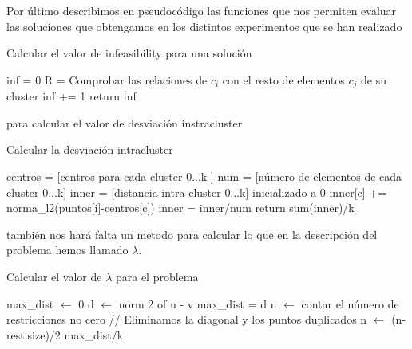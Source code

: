 \documentclass[11pt]{article}
\begin{document}
Por último describimos en pseudocódigo las funciones que nos permiten evaluar
las soluciones que obtengamos en los distintos experimentos que se han realizado

\begin{algorithm}[H]
  \caption{Calcular el valor de infeasibility para una solución}
  \label{alg-inf}
  \begin{algorithmic}[1]
    \State inf = 0
    \State R = Comprobar las relaciones de $c_i$ con el resto de elementos $c_j$ de su cluster
    \State inf += 1
    \EndIf
    \EndFor
    \EndFor
    \State return inf
    \EndProcedure
  \end{algorithmic}
  \end{algorithm}
  
para calcular el valor de desviación instracluster
  
  \begin{algorithm}[H]
  \caption{Calcular la desviación intracluster}
  \label{alg-intra}
  \begin{algorithmic}[1]
    \State centros = [centros para cada cluster 0...k ]
    \State num = [número de elementos de cada cluster 0...k]
    \State inner = [distancia intra cluster 0...k] inicializado a 0
    \State inner[c] += norma\_l2(puntos[i]-centros[c])
    \EndFor
    \State inner = inner/num
    \State return sum(inner)/k
    \EndProcedure
  \end{algorithmic}
  \end{algorithm}
  
  
  también nos hará falta un metodo para calcular lo que en la
  descripción del problema hemos llamado $\lambda$.
  
  \begin{algorithm}[H]
  \caption{Calcular el valor de $\lambda$ para el problema}
  \label{alg-lambda}
  \begin{algorithmic}[1]
    \State max\_dist $\leftarrow$ 0 
    \State d $\leftarrow$ norm 2 of u - v
    \State max\_dist = d
    \EndIf
    \EndFor
    \EndFor
    \State n $\leftarrow$ contar el número de restricciones no cero
    \State // Eliminamos la diagonal y los puntos duplicados
    \State n $\leftarrow$ (n-rest.size)/2
    \State \Return max\_dist/k
    \EndProcedure
  \end{algorithmic}
  \end{algorithm}
  
\end{document}
